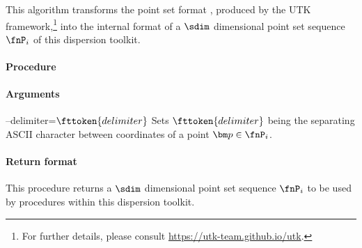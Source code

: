 %
This algorithm transforms the point set format , produced by the UTK framework,\footnote{For further details, please consult \href{https://utk-team.github.io/utk}{https://utk-team.github.io/utk}.} into the internal format of a $\sdim$ dimensional point set sequence $\fnP_i$ of this dispersion toolkit.

\paragraph{Procedure}

\begin{synopsis}
\end{synopsis}

\paragraph{Arguments}

\procarginseq{\ptseqsize}

\procargout

\begin{procarg}{--delimiter=$\fttoken{delimiter}$}
  Sets $\fttoken{delimiter}$ being the separating ASCII character between coordinates of a point $\bm p \in \fnP_i$.
\end{procarg}

\procargsilent

\paragraph{Return format}

This procedure returns a $\sdim$ dimensional point set sequence $\fnP_i$ to be used by procedures within this dispersion toolkit.
